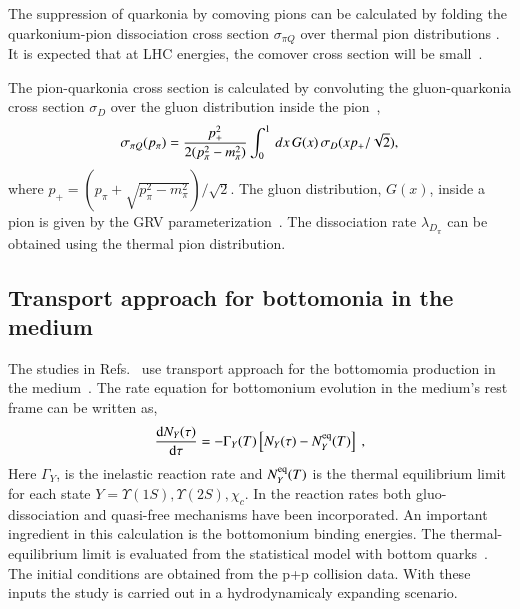 {  The suppression of quarkonia by comoving pions can be calculated by folding the quarkonium-pion
dissociation cross section $\sigma_{\pi Q}$ over thermal pion distributions \cite{Vogt:1988fj}. 
It is expected  that at LHC energies, the comover cross section will be small~\cite{Lourenco:2008sk}.
{\color{black}
The pion-quarkonia cross section is calculated by convoluting the gluon-quarkonia cross section $\sigma_D$
over the gluon distribution inside the pion~\cite{Arleo:2001mp},
\begin{equation}
\sigma_{\pi Q} (p_{\pi}) = {p_+^2 \over 2(p_\pi^2 - m_\pi^2)} \int_0^1 \, dx \, G(x) \, \sigma_D(xp_+/\sqrt {2}),
\end{equation}
where $p_+ = (p_\pi + \sqrt{p_\pi^2-m_\pi^2})/\sqrt{2}$. The gluon distribution, $G(x)$, inside a pion is 
given by the GRV parameterization~\cite{Gluck:1991ey}. 
The dissociation rate $\lambda_{D_{\pi}}$  can be obtained using the 
thermal pion distribution.




\subsection{Transport approach for bottomonia in the medium}
 The studies in Refs.~\cite{Grandchamp:2005yw,Rapp:2017chc} use 
transport approach for the bottomomia production in the medium~\cite{Grandchamp:2005yw,Rapp:2017chc}.
The rate equation for bottomonium evolution in the medium's rest frame
can be written as,
\begin{equation}
\frac{\mathrm{d} N_Y(\tau)}{\mathrm{d}\tau} =
-\Gamma_Y(T)\left[N_Y(\tau)-N^{\rm eq}_Y(T)\right] \ ,
\end{equation}
Here $\Gamma_Y$, is the inelastic reaction rate  and $N^{\rm eq}_Y(T)$ is the thermal
equilibrium limit  for each state $Y=\Upsilon(1S), \Upsilon(2S), \chi_c$.
In the reaction rates  both gluo-dissociation and quasi-free mechanisms have
been incorporated.  An important ingredient in this calculation is the bottomonium
binding energies. The thermal-equilibrium limit is evaluated from the statistical
model with bottom quarks~\cite{Grandchamp:2002wp}. 
The initial conditions are obtained from the p+p collision data. With these inputs the study is carried out in a hydrodynamicaly 
expanding scenario.  




}}
